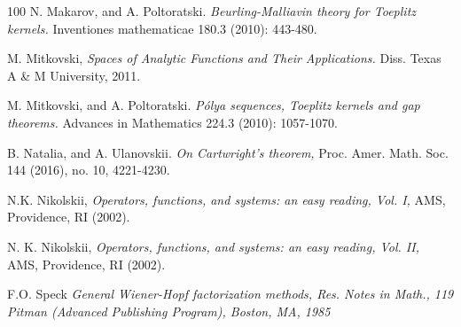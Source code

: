 \documentclass[12pt,a4paper]{amsart}
\begin{document}
\begin{thebibliography}{100}
      N. Makarov, and A. Poltoratski. {\em Beurling-Malliavin theory for Toeplitz kernels.} Inventiones mathematicae 180.3 (2010): 443-480.

      M. Mitkovski, {\em Spaces of Analytic Functions and Their Applications.} Diss. Texas A \& M University, 2011.

      M. Mitkovski, and A. Poltoratski. {\em P\'olya sequences, Toeplitz kernels and gap theorems.} Advances in Mathematics 224.3 (2010): 1057-1070.

      B. Natalia, and A. Ulanovskii. {\em On Cartwright's theorem,} Proc. Amer. Math. Soc. 144 (2016), no. 10, 4221-4230.

	  N.K. Nikolskii, {\em Operators, functions, and systems: an easy reading, Vol. I,}
	AMS, Providence, RI (2002).
	
	  N. K. Nikolskii, {\em Operators, functions, and systems: an easy reading, Vol. II,}
	AMS, Providence, RI (2002).
	
       F.O. Speck \em{ General Wiener-Hopf factorization methods}, Res. Notes in Math., 119 Pitman (Advanced Publishing Program), Boston, MA, 1985


\end{thebibliography}	
\end{document}
